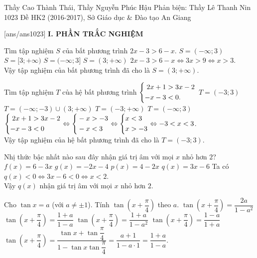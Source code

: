 \begin{name}
{Thầy Cao Thành Thái, Thầy Nguyễn Phúc Hậu \newline Phản biện: Thầy Lê Thanh Nin}
{1023 Đề HK2 (2016-2017), Sở Giáo dục \& Đào tạo An Giang}
    \end{name}
\setcounter{ex}{0}\setcounter{bt}{0}
[ans/ans1023]
\noindent\textbf{I. PHẦN TRẮC NGHIỆM}
\begin{ex}%
 Tìm tập nghiệm $S$ của bất phương trình $2x - 3 > 6 -x$.
 \choice
  {$S = (-\infty;3)$}
  {$S = [3;+\infty)$}
  {$S = (-\infty;3]$}
  {\True $S = (3;+\infty)$}
 \loigiai
  {
  $2x - 3 > 6 -x \Leftrightarrow 3x > 9 \Leftrightarrow x > 3$.\\
  Vậy tập nghiệm của bất phương trình đã cho là $S = (3;+\infty)$.
  }
\end{ex}


\begin{ex}%
 Tìm tập nghiệm $T$ của hệ bất phương trình $\left\{\begin{aligned}2x+1&>3x-2 \\ -x-3&<0.\end{aligned}\right.$
 \choice
  {\True $T = (-3;3)$}
  {$T = (-\infty;-3) \cup (3;+\infty)$}
  {$T = (-3;+\infty)$}
  {$T = (-\infty;3)$}
 \loigiai
  {
  $\left\{\begin{aligned}2x+1&>3x-2 \\ -x-3&<0\end{aligned}\right. \Leftrightarrow \left\{\begin{aligned}& -x > -3 \\& -x < 3\end{aligned}\right. \Leftrightarrow \left\{\begin{aligned}& x<3 \\& x> -3\end{aligned}\right. \Leftrightarrow -3 < x < 3$.\\
  Vậy tập nghiệm của hệ bất phương trình đã cho là $T = (-3;3)$.
  }
\end{ex}


\begin{ex}%
 Nhị thức bậc nhất nào sau đây nhận giá trị âm với mọi $x$ nhỏ hơn $2$?
 \choice
  {$f(x) = 6-3x$}
  {$g(x) = -2x-4$}
  {$p(x) = 4-2x$}
  {\True $q(x) = 3x-6$}
 \loigiai
  {
  Ta có $q(x) < 0 \Leftrightarrow 3x - 6 < 0 \Leftrightarrow x <2$.\\
  Vậy $q(x)$ nhận giá trị âm với mọi $x$ nhỏ hơn $2$.
  }
\end{ex}


\begin{ex}%
 Cho $\tan x = a$ (với $a \neq \pm 1$). Tính $\tan \left(x+\dfrac{\pi}{4}\right)$ theo $a$.
 \choice
  {$\tan \left(x+\dfrac{\pi}{4}\right) = \dfrac{2a}{1-a^2}$}
  {\True $\tan \left(x+\dfrac{\pi}{4}\right) = \dfrac{1+a}{1-a}$}
  {$\tan \left(x+\dfrac{\pi}{4}\right) = \dfrac{1+a}{1-a^2}$}
  {$\tan \left(x+\dfrac{\pi}{4}\right) = \dfrac{1-a}{1+a}$}
 \loigiai
 {
 $\tan \left(x+\dfrac{\pi}{4}\right) = \dfrac{ \tan x + \tan \dfrac{\pi}{4}}{1 - \tan x \tan \dfrac{\pi}{4}} = \dfrac{a + 1}{1 - a \cdot 1} = \dfrac{1 + a}{1 - a}$.
 }
\end{ex}


